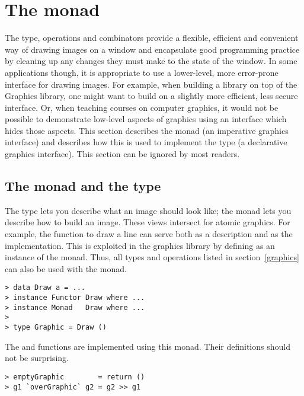 
\section{The  monad}\label{Draw}

The  type, operations and combinators provide a
flexible, efficient and convenient way of drawing images on a window
and encapsulate good programming practice by cleaning up any changes
they must make to the state of the window.  In some applications
though, it is appropriate to use a lower-level, more error-prone
interface for drawing images.  For example, when building a library on
top of the Graphics library, one might want to build on a slightly
more efficient, less secure interface.  Or, when teaching courses on
computer graphics, it would not be possible to demonstrate low-level
aspects of graphics using an interface which hides those aspects.
This section describes the  monad (an imperative graphics
interface) and describes how this is used to implement the
 type (a declarative graphics interface).  This section
can be ignored by most readers.

\subsection{The  monad and the  type}\label{Draw monad}

The  type lets you describe what an image should look
like; the  monad lets you describe how to build an image.
These views intersect for atomic graphics.  For example, the function
to draw a line can serve both as a description and as the
implementation.  This is exploited in the graphics library by defining
 as an instance of the  monad.  Thus, all
 types and operations listed in section~\ref{graphics}
can also be used with the  monad.

\begin{verbatim}
> data Draw a = ...
> instance Functor Draw where ...
> instance Monad   Draw where ...
>
> type Graphic = Draw ()
\end{verbatim}

The  and  functions are implemented
using this monad.  Their definitions should not be surprising.
\begin{verbatim}
> emptyGraphic        = return ()
> g1 `overGraphic` g2 = g2 >> g1
\end{verbatim}

